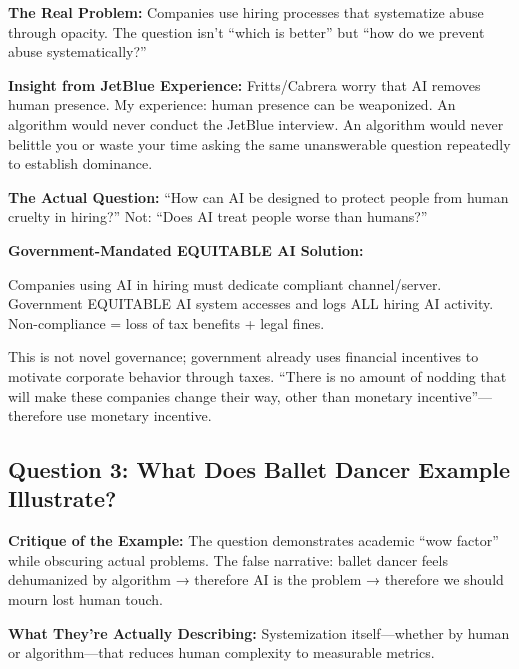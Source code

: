 \documentclass[12pt,letterpaper]{article}
\begin{document}
\textbf{The Real Problem:} Companies use hiring processes that systematize abuse through opacity. The question isn't ``which is better'' but ``how do we prevent abuse systematically?''

\begin{personalreflection}
\textbf{Insight from JetBlue Experience:} Fritts/Cabrera worry that AI removes human presence. My experience: human presence can be weaponized. An algorithm would never conduct the JetBlue interview. An algorithm would never belittle you or waste your time asking the same unanswerable question repeatedly to establish dominance.
\end{personalreflection}

\textbf{The Actual Question:} ``How can AI be designed to protect people from human cruelty in hiring?'' Not: ``Does AI treat people worse than humans?''

\begin{puzzleplan}
\textbf{Government-Mandated EQUITABLE AI Solution:} 

Companies using AI in hiring must dedicate compliant channel/server. Government EQUITABLE AI system accesses and logs ALL hiring AI activity. Non-compliance = loss of tax benefits + legal fines.

This is not novel governance; government already uses financial incentives to motivate corporate behavior through taxes. ``There is no amount of nodding that will make these companies change their way, other than monetary incentive''—therefore use monetary incentive.
\end{puzzleplan}

\subsection*{Question 3: What Does Ballet Dancer Example Illustrate?}

\begin{criticalinsight}
\textbf{Critique of the Example:} The question demonstrates academic ``wow factor'' while obscuring actual problems. The false narrative: ballet dancer feels dehumanized by algorithm → therefore AI is the problem → therefore we should mourn lost human touch.
\end{criticalinsight}

\textbf{What They're Actually Describing:} Systemization itself—whether by human or algorithm—that reduces human complexity to measurable metrics.
\end{document}
